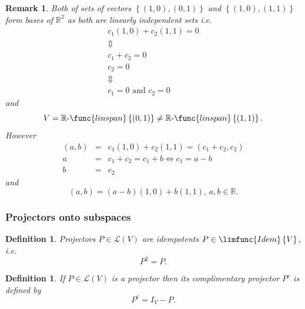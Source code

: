 \documentclass[aps,preprint]{revtex4}
\newtheorem{definition}[theorem]{Definition}
\newtheorem{remark}[theorem]{Remark}
\begin{document}
\begin{remark}
Both of sets of vectors $\left\{ \left( 1,0\right) ,\left( 0,1\right)
\right\} $ and $\left\{ \left( 1,0\right) ,\left( 1,1\right) \right\} $ form
bases of $\mathbb{R}^{2}$ as both are linearly independent sets i.e. 
\begin{gather}
c_{1}\left( 1,0\right) +c_{2}\left( 1,1\right) =0 \\
\Updownarrow \\
c_{1}+c_{2}=0 \\
c_{2}=0 \\
\Updownarrow \\
c_{1}=0\text{ and }c_{2}=0
\end{gather}%
and 
\begin{equation}
V=\mathbb{R}\text{-}\func{linspan}\left\{ \left( 0,1\right) \right\} \neq 
\mathbb{R}\text{-}\func{linspan}\left\{ \left( 1,1\right) \right\} .
\end{equation}%
However 
\begin{eqnarray}
\left( a,b\right) &=&c_{1}\left( 1,0\right) +c_{2}\left( 1,1\right) =\left(
c_{1}+c_{2},c_{2}\right) \\
a &=&c_{1}+c_{2}=c_{1}+b\Leftrightarrow c_{1}=a-b \\
b &=&c_{2}
\end{eqnarray}%
and 
\begin{equation}
\left( a,b\right) =\left( a-b\right) \left( 1,0\right) +b\left( 1,1\right)
,\,a,b\in \mathbb{R}.
\end{equation}
\end{remark}

\subsubsection{Projectors onto subspaces}

\begin{definition}
Projectors $P\in \mathcal{L}\left( V\right) $ are idempotents $P\in \limfunc{%
Idem}\left\{ V\right\} ,$ i.e. 
\begin{equation}
P^{2}=P.
\end{equation}
\end{definition}

\begin{definition}
If $P\in \mathcal{L}\left( V\right) $ is a projector then its complimentary
projector $P^{c}$ is defined by 
\begin{equation}
P^{c}=I_{V}-P.
\end{equation}
\end{definition}
\end{document}
